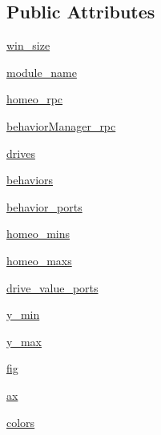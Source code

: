 \subsection*{Public Attributes}
\begin{DoxyCompactItemize}
\item 
\hyperlink{classallostatic__plot_1_1AllostaticPlotModule_a4912de546db648dde61080f5453b6da8}{win\+\_\+size}
\item 
\hyperlink{classallostatic__plot_1_1AllostaticPlotModule_a77f1068a74d5db86baa92d0f797ad824}{module\+\_\+name}
\item 
\hyperlink{classallostatic__plot_1_1AllostaticPlotModule_abacef241d4f2cd836cb7d94bf3d4a25f}{homeo\+\_\+rpc}
\item 
\hyperlink{classallostatic__plot_1_1AllostaticPlotModule_ac1e43c2ec7d9daea17d56ddbf343ab8a}{behavior\+Manager\+\_\+rpc}
\item 
\hyperlink{classallostatic__plot_1_1AllostaticPlotModule_a3ec11dc8ca13afbf582bf5d398e75bfa}{drives}
\item 
\hyperlink{classallostatic__plot_1_1AllostaticPlotModule_a1bed1e170c54b9b491e7e7aa8de2348c}{behaviors}
\item 
\hyperlink{classallostatic__plot_1_1AllostaticPlotModule_a71cb4e1a3ff8e3c106dcabc87d0dce98}{behavior\+\_\+ports}
\item 
\hyperlink{classallostatic__plot_1_1AllostaticPlotModule_a28333321516e3ab92b4cf07cb2668306}{homeo\+\_\+mins}
\item 
\hyperlink{classallostatic__plot_1_1AllostaticPlotModule_a0ff2af003f881c039e34f98ad1a3848c}{homeo\+\_\+maxs}
\item 
\hyperlink{classallostatic__plot_1_1AllostaticPlotModule_a08ac463c0d2924e1ca9379347eeef3c6}{drive\+\_\+value\+\_\+ports}
\item 
\hyperlink{classallostatic__plot_1_1AllostaticPlotModule_a101cadb34446fbbebc108d35cf9c3770}{y\+\_\+min}
\item 
\hyperlink{classallostatic__plot_1_1AllostaticPlotModule_aaf1e220705544b845984479067f36be4}{y\+\_\+max}
\item 
\hyperlink{classallostatic__plot_1_1AllostaticPlotModule_a7517019a22f5af8af21fbb68c66dd037}{fig}
\item 
\hyperlink{classallostatic__plot_1_1AllostaticPlotModule_a6caa2fd6a9cedb1cd0e9c9aa8e3a05a9}{ax}
\item 
\hyperlink{classallostatic__plot_1_1AllostaticPlotModule_a0fee29ca4ddf67ef5f21127a466886c3}{colors}
\item 

\end{DoxyCompactItemize}

